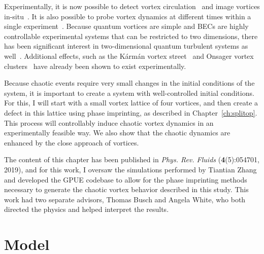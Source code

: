 Experimentally, it is now possible to detect vortex circulation~\cite{seo2017} and image vortices in-situ~\cite{wilson2015}.
It is also possible to probe vortex dynamics at different times within a single experiment~\cite{freilich2010, serafini2017}.
Because quantum vortices are simple and BECs are highly controllable experimental systems that can be restricted to two dimensions, there has been significant interest in two-dimensional quantum turbulent systems as well~\cite{neely2013,shin2004}.
Additional effects, such as the K\'arm\'an vortex street~\cite{kwon2014} and Onsager vortex clusters~\cite{gauthier2018,johnstone2018} have already been shown to exist experimentally.

Because chaotic events require very small changes in the initial conditions of the system, it is important to create a system with well-controlled initial conditions.
For this, I will start with a small vortex lattice of four vortices, and then create a defect in this lattice using phase imprinting, as described in Chapter~\ref{ch:splitop}.
This process will controllably induce chaotic vortex dynamics in an experimentally feasible way.
We also show that the chaotic dynamics are enhanced by the close approach of vortices.

The content of this chapter has been published in \textit{Phys. Rev. Fluids} (\textbf{4}(5):054701, 2019), and for this work, I oversaw the simulations performed by Tiantian Zhang and developed the GPUE codebase to allow for the phase imprinting methods necessary to generate the chaotic vortex behavior described in this study.
This work had two separate advisors, Thomas Busch and Angela White, who both directed the physics and helped interpret the results.

\section{Model}

